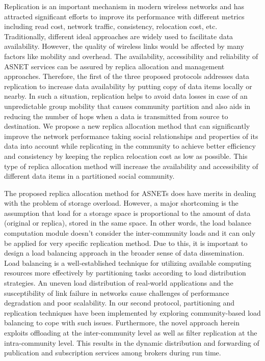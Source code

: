 Replication is an important mechanism in modern wireless networks and has attracted significant efforts to improve its performance with different metrics including read cost, network traffic, consistency, relocation cost, etc. Traditionally, different ideal approaches are widely used to facilitate data availability. However, the quality of wireless links would be affected by many factors like mobility and overhead. The availability, accessibility and reliability of ASNET services can be assured by replica allocation and management approaches. Therefore, the first of the three proposed protocols addresses data replication to increase data availability by putting copy of data items locally or nearby. In such a situation, replication helps to avoid data losses in case of an unpredictable group mobility that causes community partition and also aids in reducing the number of hops when a data is transmitted from source to destination. We propose a new replica allocation method that can significantly improve the network performance taking social relationships and properties of its data into account while replicating in the community to achieve better efficiency and consistency by keeping the replica relocation cost as low as possible. This type of replica allocation method will increase the availability and accessibility of different data items in a partitioned social community.

The proposed replica allocation method for ASNETs does have merits in dealing with the problem of storage overload. However, a major shortcoming is the assumption that load for a storage space is proportional to the amount of data (original or replica), stored in the same space. In other words, the load balance computation module doesn't consider the inter-community loads and it can only be applied for very specific replication method. Due to this, it is important to design a load balancing approach in the broader sense of data dissemination. Load balancing is a well-established technique for utilizing available computing resources more effectively by partitioning tasks according to load distribution strategies. An uneven load distribution of real-world applications and the susceptibility of link failure in networks cause challenges of performance degradation and poor scalability. In our second protocol, partitioning and replication techniques have been implemented by exploring community-based load balancing to cope with such issues. Furthermore, the novel approach herein exploits offloading at the inter-community level as well as filter replication at the intra-community level. This results in the dynamic distribution and forwarding of publication and subscription services among brokers during run time.

